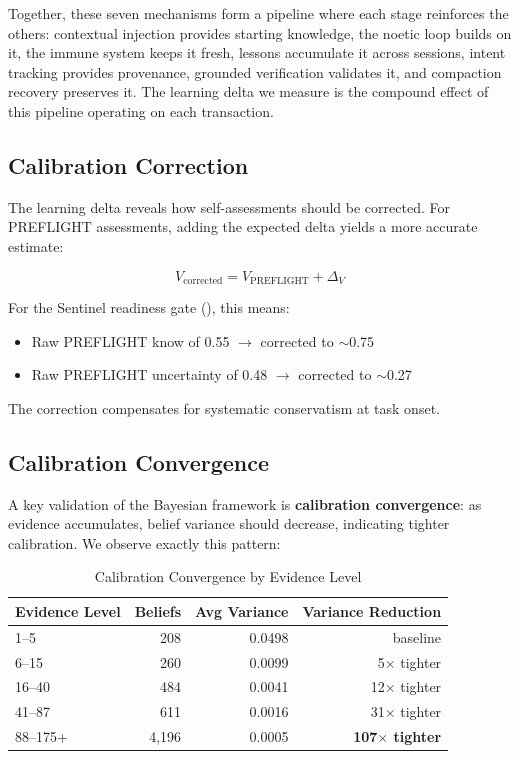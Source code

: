 \medskip
\noindent Together, these seven mechanisms form a pipeline where each stage reinforces the others: contextual injection provides starting knowledge, the noetic loop builds on it, the immune system keeps it fresh, lessons accumulate it across sessions, intent tracking provides provenance, grounded verification validates it, and compaction recovery preserves it. The learning delta we measure is the compound effect of this pipeline operating on each transaction.

\subsection{Calibration Correction}

The learning delta reveals how self-assessments should be corrected. For PREFLIGHT assessments, adding the expected delta yields a more accurate estimate:

\begin{equation}
V_{\text{corrected}} = V_{\text{PREFLIGHT}} + \Delta_V
\end{equation}

For the Sentinel readiness gate (), this means:
\begin{itemize}
    \item Raw PREFLIGHT know of 0.55 $\rightarrow$ corrected to $\sim$0.75
    \item Raw PREFLIGHT uncertainty of 0.48 $\rightarrow$ corrected to $\sim$0.27
\end{itemize}

The correction compensates for systematic conservatism at task onset.

\subsection{Calibration Convergence}

A key validation of the Bayesian framework is \textbf{calibration convergence}: as evidence accumulates, belief variance should decrease, indicating tighter calibration. We observe exactly this pattern:

\begin{table}[h]
\centering
\begin{tabular}{lrrr}
\toprule
\textbf{Evidence Level} & \textbf{Beliefs} & \textbf{Avg Variance} & \textbf{Variance Reduction} \\
\midrule
1--5 & 208 & 0.0498 & baseline \\
6--15 & 260 & 0.0099 & 5$\times$ tighter \\
16--40 & 484 & 0.0041 & 12$\times$ tighter \\
41--87 & 611 & 0.0016 & 31$\times$ tighter \\
88--175+ & 4,196 & 0.0005 & \textbf{107$\times$ tighter} \\
\bottomrule
\end{tabular}
\caption{Calibration Convergence by Evidence Level}
\label{tab:calibration-convergence}
\end{table}

